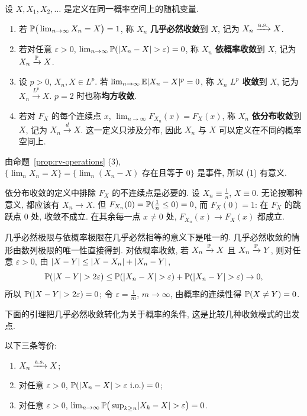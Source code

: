 \begin{definition}[收敛模式]\label{def:convergence-modes}
设 $X,X_1,X_2,\dots$ 是定义在同一概率空间上的随机变量.
\begin{enumerate}
\item 若 $\P\big(\lim_{n\to\infty}X_n=X\big)=1$, 称 $X_n$ \textbf{几乎必然收敛}到 $X$, 记为 $X_n\xrightarrow{\as}X$.
\item 若对任意 $\varepsilon>0$, $\lim_{n\to\infty}\P(\abs{X_n-X}>\varepsilon)=0$, 称 $X_n$ \textbf{依概率收敛}到 $X$, 记为 $X_n\xrightarrow{\P}X$.
\item 设 $p>0$, $X_n,X\in L^p$. 若 $\lim_{n\to\infty}\E\abs{X_n-X}^p=0$, 称 $X_n$ \textbf{$L^p$ 收敛}到 $X$, 记为 $X_n\xrightarrow{L^p}X$. $p=2$ 时也称\textbf{均方收敛}.
\item 若对 $F_X$ 的每个连续点 $x$, $\lim_{n\to\infty}F_{X_n}(x)=F_X(x)$, 称 $X_n$ \textbf{依分布收敛}到 $X$, 记为 $X_n\xrightarrow{d}X$. 这一定义只涉及分布, 因此 $X_n$ 与 $X$ 可以定义在不同的概率空间上.
\end{enumerate}
\end{definition}

由命题~\ref{prop:rv-operations} (3), $\{\lim_n X_n=X\}=\{\lim_n(X_n-X)\text{ 存在且等于 }0\}$ 是事件, 所以 (1) 有意义.

\begin{remark}
依分布收敛的定义中排除 $F_X$ 的不连续点是必要的. 设 $X_n\equiv\frac{1}{n}$, $X\equiv0$. 无论按哪种意义, 都应该有 $X_n\to X$. 但 $F_{X_n}(0)=\P(\frac{1}{n}\le0)=0$, 而 $F_X(0)=1$: 在 $F_X$ 的跳跃点 $0$ 处, 收敛不成立. 在其余每一点 $x\ne0$ 处, $F_{X_n}(x)\to F_X(x)$ 都成立.
\end{remark}

几乎必然极限与依概率极限在几乎必然相等的意义下是唯一的. 几乎必然收敛的情形由数列极限的唯一性直接得到. 对依概率收敛, 若 $X_n\xrightarrow{\P}X$ 且 $X_n\xrightarrow{\P}Y$, 则对任意 $\varepsilon>0$, 由 $\abs{X-Y}\le\abs{X-X_n}+\abs{X_n-Y}$,
\[
\P(\abs{X-Y}>2\varepsilon)\le\P(\abs{X_n-X}>\varepsilon)+\P(\abs{X_n-Y}>\varepsilon)\to0,
\]
所以 $\P(\abs{X-Y}>2\varepsilon)=0$; 令 $\varepsilon=\frac{1}{m}$, $m\to\infty$, 由概率的连续性得 $\P(X\ne Y)=0$.

下面的引理把几乎必然收敛转化为关于概率的条件, 这是比较几种收敛模式的出发点.

\begin{lemma}[几乎必然收敛的刻画]\label{lem:as-criterion}
以下三条等价:
\begin{enumerate}
\item $X_n\xrightarrow{\as}X$;
\item 对任意 $\varepsilon>0$, $\P(\abs{X_n-X}>\varepsilon\ \text{i.o.})=0$;
\item 对任意 $\varepsilon>0$, $\lim_{n\to\infty}\P\big(\sup_{k\ge n}\abs{X_k-X}>\varepsilon\big)=0$.
\end{enumerate}
\end{lemma}

